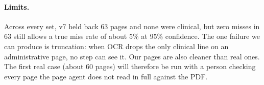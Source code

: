 \paragraph{Limits.} Across every set, v7 held back 63 pages and none
were clinical, but zero misses in 63 still allows a true miss rate of
about 5\% at 95\% confidence. The one failure we can produce is
truncation: when OCR drops the only clinical line on an administrative
page, no step can see it. Our pages are also cleaner than real ones. The
first real case (about 60 pages) will therefore be run with a person
checking every page the page agent does not read in full against the PDF.
